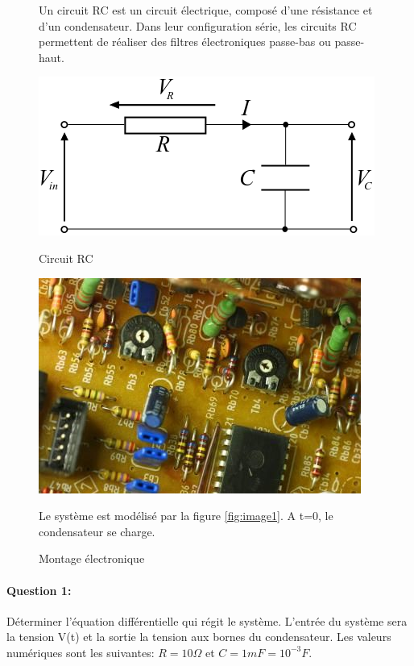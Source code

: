 \begin{figure}[!h]
\begin{minipage}{.55\linewidth}
Un circuit RC est un circuit électrique, composé d'une résistance et d'un condensateur. Dans leur configuration série, les circuits RC permettent de réaliser des filtres électroniques passe-bas ou passe-haut.
\begin{center}
\includegraphics[width=0.8\linewidth]{img/Series-RC}
\caption{Circuit RC}
\label{fig:image1}
\end{center}
\end{minipage}
\hfill
\begin{minipage}{.40\linewidth}
\begin{center}
\includegraphics[width=0.8\linewidth]{img/circuit_RC.jpg}
\caption{Montage électronique}
\label{fig:image2}
\end{center}
Le système est modélisé par la figure \ref{fig:image1}. A t=0, le condensateur se charge.
\end{minipage}
\end{figure}

\paragraph{Question 1:}

Déterminer l'équation différentielle qui régit le système. L'entrée du système sera la tension V(t) et la sortie la tension aux bornes du condensateur. Les valeurs numériques sont les suivantes: $R=10\Omega$ et $C=1mF=10^{-3}F$.


